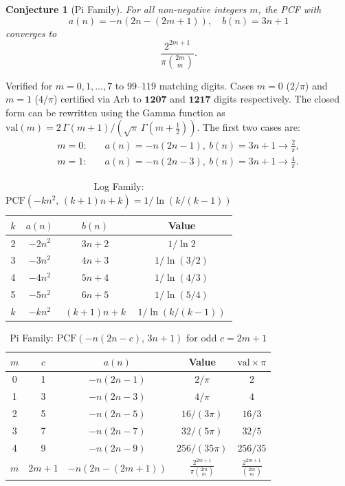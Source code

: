 \documentclass[11pt]{article}
\newtheorem{conjecture}{Conjecture}
\begin{document}
\smallskip

\begin{conjecture}[Pi Family]\label{conj:pi}
For all non-negative integers $m$, the PCF with
\[
  a(n) = -n(2n - (2m+1)), \quad b(n) = 3n + 1
\]
converges to
\[
  \frac{2^{2m+1}}{\pi \binom{2m}{m}}.
\]
\end{conjecture}

\noindent Verified for $m = 0, 1, \ldots, 7$ to $99$--$119$ matching digits.
Cases $m = 0$ ($2/\pi$) and $m = 1$ ($4/\pi$) certified via Arb to
$\mathbf{1207}$ and $\mathbf{1217}$ digits respectively.
The closed form can be rewritten using the Gamma function as
$\text{val}(m) = 2\,\Gamma(m+1) / (\sqrt{\pi}\,\Gamma(m+\tfrac{1}{2}))$.
The first two cases are:
\begin{align*}
  m = 0: &\quad a(n) = -n(2n-1),\ b(n) = 3n+1 \longrightarrow \frac{2}{\pi}, \\
  m = 1: &\quad a(n) = -n(2n-3),\ b(n) = 3n+1 \longrightarrow \frac{4}{\pi}.
\end{align*}

\begin{table}[h]
\centering
\caption{Log Family: $\text{PCF}(-kn^2,\,(k\!+\!1)n\!+\!k) = 1/\ln(k/(k\!-\!1))$}
\begin{tabular}{cccc}
\hline
$k$ & $a(n)$ & $b(n)$ & Value \\
\hline
2 & $-2n^2$ & $3n+2$ & $1/\ln 2$ \\
3 & $-3n^2$ & $4n+3$ & $1/\ln(3/2)$ \\
4 & $-4n^2$ & $5n+4$ & $1/\ln(4/3)$ \\
5 & $-5n^2$ & $6n+5$ & $1/\ln(5/4)$ \\
$k$ & $-kn^2$ & $(k\!+\!1)n\!+\!k$ & $1/\ln(k/(k\!-\!1))$ \\
\hline
\end{tabular}
\end{table}

\begin{table}[h]
\centering
\caption{Pi Family: $\text{PCF}(-n(2n\!-\!c),\,3n\!+\!1)$ for odd $c = 2m+1$}
\begin{tabular}{ccccc}
\hline
$m$ & $c$ & $a(n)$ & Value & $\text{val}\times\pi$ \\
\hline
0 & 1 & $-n(2n-1)$ & $2/\pi$ & $2$ \\
1 & 3 & $-n(2n-3)$ & $4/\pi$ & $4$ \\
2 & 5 & $-n(2n-5)$ & $16/(3\pi)$ & $16/3$ \\
3 & 7 & $-n(2n-7)$ & $32/(5\pi)$ & $32/5$ \\
4 & 9 & $-n(2n-9)$ & $256/(35\pi)$ & $256/35$ \\
$m$ & $2m\!+\!1$ & $-n(2n\!-\!(2m\!+\!1))$ & $\frac{2^{2m+1}}{\pi\binom{2m}{m}}$ & $\frac{2^{2m+1}}{\binom{2m}{m}}$ \\
\hline
\end{tabular}
\end{table}
\end{document}
